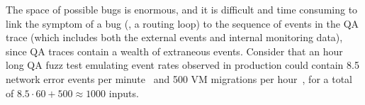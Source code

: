 The space of possible bugs is enormous, and it is difficult and time
consuming to link the
symptom of a bug (\eg, a routing loop) to the sequence of events in the QA
trace (which includes both the external events and internal monitoring data),
since QA traces contain a wealth
of extraneous events.
Consider that an hour long QA fuzz test
emulating event rates observed in production could contain 8.5 network error events per
minute~\cite{Greenberg:2009:VSF:1592568.1592576} and 500 VM migrations per
hour~\cite{Soundararajan:2010:CBS:1899928.1899941},
for a total of $8.5 \cdot 60 + 500 \approx 1000$ inputs.


